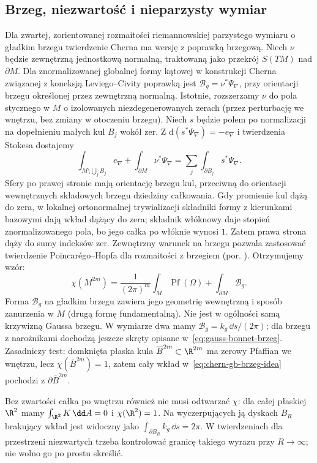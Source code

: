 \subsection*{Brzeg, niezwartość i nieparzysty wymiar}

Dla zwartej, zorientowanej rozmaitości riemannowskiej
parzystego wymiaru o gładkim brzegu twierdzenie Cherna
ma wersję z poprawką brzegową. Niech $\nu$ będzie
zewnętrzną jednostkową normalną, traktowaną jako przekrój
$S(TM)$ nad $\partial M$. Dla znormalizowanej globalnej
formy kątowej w konstrukcji Cherna związanej z koneksją
Leviego--Civity poprawką jest $\mathcal B_g=\nu^*\Psi_\nabla$,
przy orientacji brzegu określonej przez zewnętrzną normalną.
Istotnie, rozszerzamy $\nu$ do pola stycznego w $M$
o izolowanych niezdegenerowanych zerach (przez perturbację
we wnętrzu, bez zmiany w otoczeniu brzegu).
Niech $s$ będzie polem po normalizacji na dopełnieniu
małych kul $B_j$ wokół zer. Z
$\mathrm d(s^*\Psi_\nabla)=-e_\nabla$ i twierdzenia
Stokesa dostajemy
\[
 \int_{M\setminus\bigcup_j B_j}e_\nabla+
 \int_{\partial M}\nu^*\Psi_\nabla
 =\sum_j\int_{\partial B_j}s^*\Psi_\nabla .
\]
Sfery po prawej stronie mają orientację brzegu kul,
przeciwną do orientacji wewnętrznych składowych brzegu
dziedziny całkowania. Gdy promienie kul dążą do zera,
w lokalnej ortonormalnej trywializacji składniki formy
z kierunkami bazowymi dają wkład dążący do zera;
składnik włóknowy daje stopień znormalizowanego pola,
bo jego całka po włóknie wynosi $1$. Zatem prawa
strona dąży do sumy indeksów zer. Zewnętrzny warunek
na brzegu pozwala zastosować twierdzenie Poincarégo--Hopfa
dla rozmaitości z brzegiem (por.
).
Otrzymujemy wzór:
\begin{equation}\label{eq:chern-gb-brzeg-idea}
 \chi(M^{2m})=
 \frac1{(2\pi)^m}\int_M\operatorname{Pf}(\Omega)
 +\int_{\partial M}\mathcal B_g.
\end{equation}
Forma $\mathcal B_g$ na gładkim brzegu zawiera jego
geometrię wewnętrzną i sposób zanurzenia w $M$
(drugą formę fundamentalną). Nie jest w ogólności
samą krzywizną Gaussa brzegu. W wymiarze dwa mamy
$\mathcal B_g=k_g\,\dd s/(2\pi)$; dla brzegu
z narożnikami dochodzą jeszcze skręty opisane
w~\eqref{eq:gauss-bonnet-brzeg}. Zasadniczy test:
domknięta płaska kula $\overline B^{2m}\subset\R^{2m}$
ma zerowy Pfaffian we wnętrzu, lecz $\chi(\overline B^{2m})=1$,
zatem cały wkład w~\eqref{eq:chern-gb-brzeg-idea}
pochodzi z $\partial\overline B^{2m}$.

Bez zwartości całka po wnętrzu również nie musi
odtwarzać $\chi$: dla całej płaskiej $\R^2$
mamy $\int_{\R^2}K\,\dd A=0$ i $\chi(\R^2)=1$.
Na wyczerpujących ją dyskach $B_R$ brakujący wkład
jest widoczny jako $\int_{\partial B_R}k_g\,\dd s=2\pi$.
W twierdzeniach dla przestrzeni niezwartych trzeba
kontrolować granicę takiego wyrazu przy $R\to\infty$;
nie wolno go po prostu skreślić.

